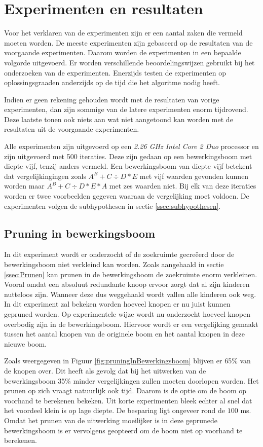 \documentclass[Main.tex]{subfiles}
\begin{document}
\section{Experimenten en resultaten}
Voor het verklaren van de experimenten zijn er een aantal zaken die vermeld moeten worden. De meeste experimenten zijn gebaseerd op de resultaten van de voorgaande experimenten. Daarom worden de experimenten in een bepaalde volgorde uitgevoerd. Er worden verschillende beoordelingswijzen gebruikt bij het onderzoeken van de experimenten. Enerzijds testen de experimenten op oplossingsgraad\footnotemark[\ref{note:oplossingsgraad}] en anderzijds op de tijd die het algoritme nodig heeft. 
\par Indien er geen rekening gehouden wordt met de resultaten van vorige experimenten, dan zijn sommige van de latere experimenten enorm tijdrovend. Deze laatste tonen ook niets aan wat niet aangetoond kan worden met de resultaten uit de voorgaande experimenten. \par Alle experimenten zijn uitgevoerd op een \textit{2.26 GHz Intel Core 2 Duo} processor en zijn uitgevoerd met 500 iteraties. Deze zijn gedaan op een bewerkingsboom met diepte vijf, tenzij anders vermeld. Een bewerkingsboom van diepte vijf betekent dat vergelijkingingen zoals $A^{B}+C \div D \ast E$ met vijf waarden gevonden kunnen worden maar $A^{B}+C \div D \ast E \ast A$ met zes waarden niet. Bij elk van deze iteraties worden er twee voorbeelden gegeven waaraan de vergelijking moet voldoen. De experimenten volgen de subhypothesen in sectie \ref{ssec:subhypothesen}.  

\subsection{Pruning in bewerkingsboom} \label{ssec:pruning}
In dit experiment wordt er onderzocht of de zoekruimte gecre\"eerd door de bewerkingsboom niet verkleind kan worden. Zoals aangehaald in sectie \ref{ssec:Prunen} kan prunen in de bewerkingsboom de zoekruimte enorm verkleinen. Vooral omdat een absoluut redundante knoop ervoor zorgt dat al zijn kinderen nutteloos zijn. Wanneer deze dus weggehaald wordt vallen alle kinderen ook weg. In dit experiment zal bekeken worden hoeveel knopen er nu juist kunnen gepruned worden. Op experimentele wijze wordt nu onderzocht hoeveel knopen overbodig zijn in de bewerkingsboom. Hiervoor wordt er een vergelijking gemaakt tussen het aantal knopen van de originele boom en het aantal knopen in deze nieuwe boom.
\par Zoals weergegeven in Figuur \ref{fig:pruningInBewerkingsboom} blijven er 65\% van de knopen over. Dit heeft als gevolg dat bij het uitwerken van de bewerkingsboom 35\% minder vergelijkingen zullen moeten doorlopen worden. Het prunen op zich vraagt natuurlijk ook tijd. Daarom is de optie om de boom op voorhand te berekenen bekeken. Uit korte experimenten bleek echter al snel dat het voordeel klein is op lage diepte. De besparing ligt ongeveer rond de $100$ ms. Omdat het prunen van de uitwerking moeilijker is in deze geprunede bewerkingsboom is er vervolgens geopteerd om de boom niet op voorhand te berekenen.
\end{document}
